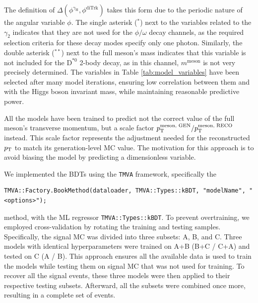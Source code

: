 The definition of $\Delta(\phi^{\gamma_{\text{H}}}, \phi^{\text{diTrk}})$ takes this form due to the periodic nature of the angular variable $\phi$. The single asterisk ($^{*}$) next to the variables related to the $\gamma_2$ indicates that they are not used for the $\phi/\omega$ decay channels, as the required selection criteria for these decay modes specify only one photon. Similarly, the double asterisk ($^{**}$) next to the full meson's mass indicates that this variable is not included for the $\text{D}^{*0}$ 2-body decay, as in this channel, $m^{\text{meson}}$ is not very precisely determined. The variables in Table \ref{tab:model_variables} have been selected after many model iterations, ensuring low correlation between them and with the Higgs boson invariant mass, while maintaining reasonable predictive power.

All the models have been trained to predict not the correct value of the full meson's transverse momentum, but a scale factor $p_\text{T}^{\text{meson, GEN}}/p_\text{T}^{\text{meson, RECO}}$ instead. This scale factor represents the adjustment needed for the reconstructed $p_\text{T}$ to match its generation-level MC value. The motivation for this approach is to avoid biasing the model by predicting a dimensionless variable.

We implemented the BDTs using the \verb+TMVA+ framework, specifically the
\begin{small}
\vspace*{-6pt}
\begin{verbatim}
TMVA::Factory.BookMethod(dataloader, TMVA::Types::kBDT, "modelName", "<options>");
\end{verbatim}
\vspace*{-6pt}
\end{small}
method, with the ML regressor \verb+TMVA::Types::kBDT+. To prevent overtraining, we employed cross-validation by rotating the training and testing samples. Specifically, the signal MC was divided into three subsets: A, B, and C. Three models with identical hyperparameters were trained on A+B (B+C / C+A) and tested on C (A / B). This approach ensures all the available data is used to train the models while testing them on signal MC that was not used for training. To recover all the signal events, these three models were then applied to their respective testing subsets. Afterward, all the subsets were combined once more, resulting in a complete set of events.

